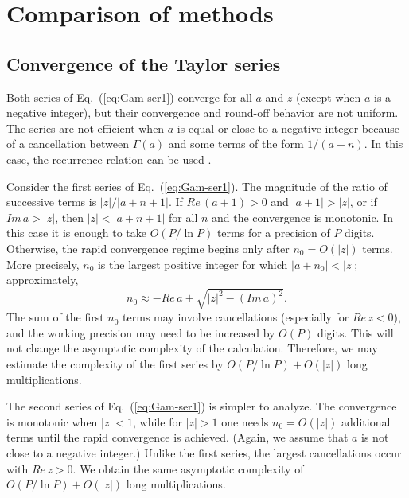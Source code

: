 \documentclass{llncs}
\begin{document}
\section{Comparison of methods}


\subsection{Convergence of the Taylor series}

Both series of Eq.~(\ref{eq:Gam-ser1}) converge for all $a$ and
$z$ (except when $a$ is a negative integer), but their convergence
and round-off behavior are not uniform. The series are not efficient
when $a$ is equal or close to a negative integer because of a cancellation
between $\Gamma \left(a\right)$ and some terms of the form $1/(a+n)$.
In this case, the recurrence relation can be used \cite{Gautschi99}.

Consider the first series of Eq.~(\ref{eq:Gam-ser1}). The magnitude
of the ratio of successive terms is $\left|z\right|/\left|a+n+1\right|$.
If $Re\, \left(a+1\right)>0$ and $\left|a+1\right|>\left|z\right|$,
or if $Im\, a>\left|z\right|$, then $\left|z\right|<\left|a+n+1\right|$
for all $n$ and the convergence is monotonic. In this case it is
enough to take $O\left(P/\ln P\right)$ terms for a precision of $P$
digits. Otherwise, the rapid convergence regime begins only after
$n_{0}=O\left(\left|z\right|\right)$ terms. More precisely, $n_{0}$
is the largest positive integer for which $\left|a+n_{0}\right|<\left|z\right|$;
approximately, \begin{equation}
n_{0}\approx -Re\, a+\sqrt{\left|z\right|^{2}-\left(Im\, a\right)^{2}}.\label{eq:n01est}\end{equation}
 The sum of the first $n_{0}$ terms may involve cancellations (especially
for $Re\, z<0$), and the working precision may need to be increased
by $O\left(P\right)$ digits. This will not change the asymptotic
complexity of the calculation. Therefore, we may estimate the complexity
of the first series by $O\left(P/\ln P\right)+O\left(\left|z\right|\right)$
long multiplications.

The second series of Eq.~(\ref{eq:Gam-ser1}) is simpler to analyze.
The convergence is monotonic when $\left|z\right|<1$, while for $\left|z\right|>1$
one needs $n_{0}=O\left(\left|z\right|\right)$ additional terms until
the rapid convergence is achieved. (Again, we assume that $a$ is
not close to a negative integer.) Unlike the first series, the largest
cancellations occur with $Re\, z>0$. We obtain the same asymptotic
complexity of $O\left(P/\ln P\right)+O\left(\left|z\right|\right)$
long multiplications.
\end{document}
